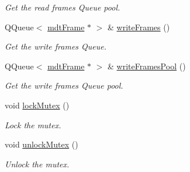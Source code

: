 \begin{DoxyCompactItemize}
\begin{DoxyCompactList}\small\item\em Get the read frames Queue pool. \end{DoxyCompactList}\item 
QQueue$<$ \hyperlink{classmdt_frame}{mdtFrame} $\ast$ $>$ \& \hyperlink{classmdt_abstract_port_a4fed10be147dfce6ca315467ff3fb968}{writeFrames} ()
\begin{DoxyCompactList}\small\item\em Get the write frames Queue. \end{DoxyCompactList}\item 
QQueue$<$ \hyperlink{classmdt_frame}{mdtFrame} $\ast$ $>$ \& \hyperlink{classmdt_abstract_port_abf093b67fddebffa4f3c52277b9a8cf7}{writeFramesPool} ()
\begin{DoxyCompactList}\small\item\em Get the write frames Queue pool. \end{DoxyCompactList}\item 
\hypertarget{classmdt_abstract_port_a6bf2ecdcf894da3929a22eb8793a9fe3}{
void \hyperlink{classmdt_abstract_port_a6bf2ecdcf894da3929a22eb8793a9fe3}{lockMutex} ()}
\label{classmdt_abstract_port_a6bf2ecdcf894da3929a22eb8793a9fe3}

\begin{DoxyCompactList}\small\item\em Lock the mutex. \end{DoxyCompactList}\item 
\hypertarget{classmdt_abstract_port_a3523c72a06e4d950338f91e56c286e84}{
void \hyperlink{classmdt_abstract_port_a3523c72a06e4d950338f91e56c286e84}{unlockMutex} ()}
\label{classmdt_abstract_port_a3523c72a06e4d950338f91e56c286e84}

\begin{DoxyCompactList}\small\item\em Unlock the mutex. \end{DoxyCompactList}\end{DoxyCompactItemize}
